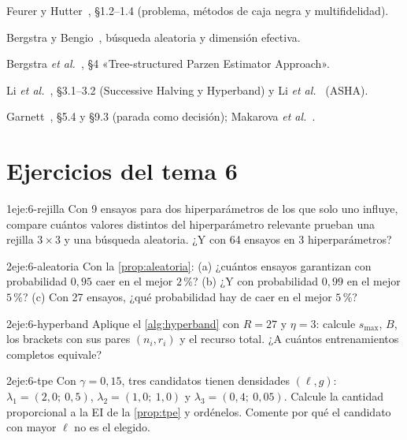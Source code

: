 \begin{lecturas}
\item Feurer y Hutter~\cite{feurer}, §1.2–1.4 (problema, métodos de caja negra y multifidelidad).
\item Bergstra y Bengio~\cite{bergstra12}, búsqueda aleatoria y dimensión efectiva.
\item Bergstra \emph{et al.}~\cite{tpe}, §4 «Tree-structured Parzen Estimator Approach».
\item Li \emph{et al.}~\cite{hyperband}, §3.1–3.2 (Successive Halving y Hyperband) y Li \emph{et al.}~\cite{asha} (ASHA).
\item Garnett~\cite{garnett}, §5.4 y §9.3 (parada como decisión); Makarova \emph{et al.}~\cite{makarova}.
\end{lecturas}

\section*{Ejercicios del tema 6}

\begin{ejercicio}{1}{eje:6-rejilla}
Con 9 ensayos para dos hiperparámetros de los que solo uno influye, compare cuántos valores distintos del hiperparámetro relevante prueban una rejilla $3\times3$ y una búsqueda aleatoria. ¿Y con 64 ensayos en 3 hiperparámetros?
\end{ejercicio}

\begin{ejercicio}{2}{eje:6-aleatoria}
Con la \cref{prop:aleatoria}: (a) ¿cuántos ensayos garantizan con probabilidad $0{,}95$ caer en el mejor $2\,\%$? (b) ¿Y con probabilidad $0{,}99$ en el mejor $5\,\%$? (c) Con 27 ensayos, ¿qué probabilidad hay de caer en el mejor $5\,\%$?
\end{ejercicio}

\begin{ejercicio}{2}{eje:6-hyperband}
Aplique el \cref{alg:hyperband} con $R=27$ y $\eta=3$: calcule $s_{\max}$, $B$, los brackets con sus pares $(n_i,r_i)$ y el recurso total. ¿A cuántos entrenamientos completos equivale?
\end{ejercicio}

\begin{ejercicio}{2}{eje:6-tpe}
Con $\gamma=0{,}15$, tres candidatos tienen densidades $(\ell,g)$: $\lambda_1=(2{,}0;\ 0{,}5)$, $\lambda_2=(1{,}0;\ 1{,}0)$ y $\lambda_3=(0{,}4;\ 0{,}05)$. Calcule la cantidad proporcional a la EI de la \cref{prop:tpe} y ordénelos. Comente por qué el candidato con mayor $\ell$ no es el elegido.
\end{ejercicio}

